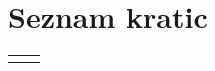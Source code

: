 \documentclass[12pt,a4paper,titlepage,openany]{report}
\begin{document}
\tableofcontents
{}
\newpage
\listoftables
{}
\newpage
\listoffigures
{}
\newpage
\renewcommand{\cftdot}{}
\listofappendices
\thispagestyle{fancy}
\newpage

\chapter*{Seznam kratic}
\thispagestyle{fancyplain}
\begin{longtable}{@{}p{1cm}@{}p{\dimexpr\textwidth-1cm\relax}@{}}
\nomenclature{$tj.$}{to je}
\nomenclature{$npr.$}{na primer}
\nomenclature{PLI}{phase lag lndex}
\end{longtable}
\newpage

\normalsize


% 
% 









\printbibliography

\end{document}
